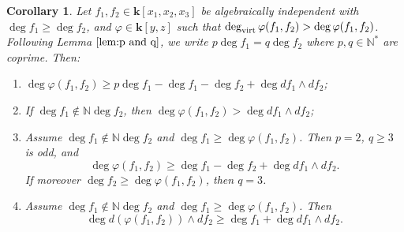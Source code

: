 \documentclass[reqno,oneside,11pt]{amsart}
\theoremstyle{plain}
\newtheorem{corollary}[theorem]{Corollary}
\theoremstyle{definition}
\newcommand{\N}{\mathbb{N}}
\newcommand{\K}{\mathbf{k}}
\renewcommand{\phi}{\varphi}
\newcommand{\dvirt}{\deg_{\text{\rm virt}}}
\renewcommand{\ge}{\geqslant}
\begin{document}
\begin{corollary}\label{cor:parachute}
Let $f_1, f_2 \in \K[x_1,x_2,x_3]$ be algebraically independent with $ \deg f_1 \ge \deg f_2$, and $\phi \in \K[y,z]$ such that $\dvirt \phi(f_1,f_2) > \deg \phi(f_1,f_2)$.
Following Lemma $\ref{lem:p and q}$, we write $p \deg f_1 = q \deg f_2$ where $p,q \in \N^*$ are coprime.
Then:
\begin{enumerate}[wide]
\item \label{parachute-i} $\deg \phi(f_1,f_2) \ge p\deg f_1 - \deg f_1 - \deg f_2 + \deg df_1\wedge df_2 $;
\item \label{parachute-ii} If $\deg f_1 \not\in \N \deg f_2$, then $\deg \phi(f_1,f_2) > \deg df_1 \wedge df_2$;
\item \label{parachute-iii} Assume $\deg f_1 \not\in \N \deg f_2$ and $\deg f_1 \ge \deg \phi(f_1,f_2)$.
Then $p = 2$, $q \ge 3$ is odd, and
$$\deg \phi(f_1,f_2) \ge \deg f_1 - \deg f_2 + \deg df_1 \wedge df_2.$$
If moreover $\deg f_2 \ge \deg \phi(f_1,f_2)$, then $q=3$.
\item \label{parachute-iv} Assume $\deg f_1 \not\in \N \deg f_2$ and $\deg f_1 \ge \deg \phi(f_1,f_2)$.
Then
$$\deg d(\phi(f_1,f_2)) \wedge df_2  \ge \deg f_1 + \deg df_1 \wedge df_2.$$
\end{enumerate}
\end{corollary}
\end{document}
